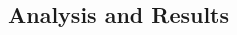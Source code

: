 \documentclass[10pt, letterpaper]{article}
\begin{document}
\begin{spacing}{1.5}
\section*{\large \bf Analysis and Results}











\end{spacing}
\end{document}
